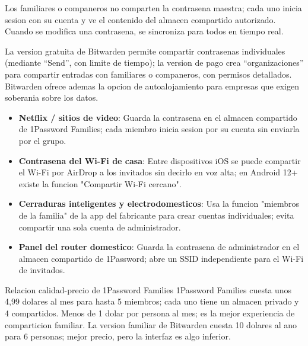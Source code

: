 Los familiares o companeros no comparten la contrasena maestra; cada uno inicia sesion con su cuenta y ve el contenido del almacen compartido autorizado. Cuando se modifica una contrasena, se sincroniza para todos en tiempo real.


La version gratuita de Bitwarden permite compartir contrasenas individuales (mediante “Send”, con limite de tiempo); la version de pago crea “organizaciones” para compartir entradas con familiares o companeros, con permisos detallados. Bitwarden ofrece ademas la opcion de autoalojamiento para empresas que exigen soberania sobre los datos.


\begin{itemize}
  \item \textbf{Netflix / sitios de video}: Guarda la contrasena en el almacen compartido de 1Password Families; cada miembro inicia sesion por su cuenta sin enviarla por el grupo.
  \item \textbf{Contrasena del Wi-Fi de casa}: Entre dispositivos iOS se puede compartir el Wi-Fi por AirDrop a los invitados sin decirlo en voz alta; en Android 12+ existe la funcion "Compartir Wi-Fi cercano".
  \item \textbf{Cerraduras inteligentes y electrodomesticos}: Usa la funcion "miembros de la familia" de la app del fabricante para crear cuentas individuales; evita compartir una sola cuenta de administrador.
  \item \textbf{Panel del router domestico}: Guarda la contrasena de administrador en el almacen compartido de 1Password; abre un SSID independiente para el Wi-Fi de invitados.
\end{itemize}

\begin{tcbinfo}{Relacion calidad-precio de 1Password Families}
1Password Families cuesta unos 4,99 dolares al mes para hasta 5 miembros; cada uno tiene un almacen privado y 4 compartidos. Menos de 1 dolar por persona al mes; es la mejor experiencia de comparticion familiar. La version familiar de Bitwarden cuesta 10 dolares al ano para 6 personas; mejor precio, pero la interfaz es algo inferior.

\end{tcbinfo}


